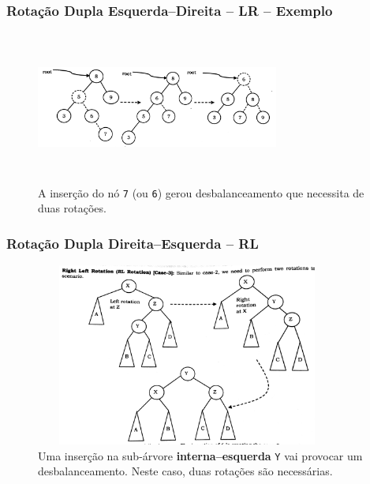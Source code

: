 
\begin{frame}
    \frametitle{Rotação Dupla Esquerda--Direita -- LR -- Exemplo}
      
   \begin{figure}[!ht]
     \centering
    \includegraphics[width=8cm, height=5cm]{figs/fig_arvores/avl05LR-example.jpg}
    \caption{A inserção do nó \texttt{7} (ou \texttt{6})  
    gerou desbalanceamento que necessita de duas rotações.}
    \end{figure}
\end{frame}


\begin{frame}
    \frametitle{Rotação Dupla Direita--Esquerda -- RL}
      
   \begin{figure}[!ht]
     \centering
    \includegraphics[width=10cm, height=6cm]{figs/fig_arvores/avl06RL.jpg}
    \caption{Uma inserção na sub-árvore \textbf{interna--esquerda} \texttt{Y} vai provocar um desbalanceamento. Neste caso, duas rotações são necessárias.}
    \end{figure}
\end{frame}


